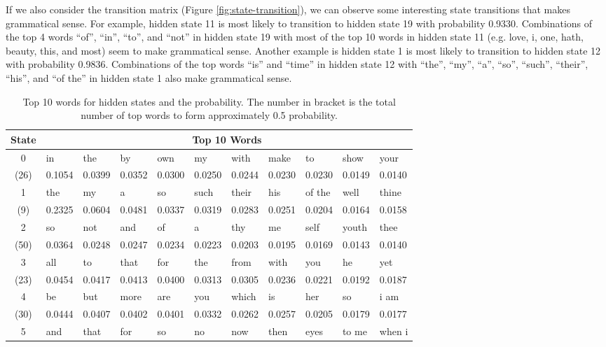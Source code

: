If we also consider the transition matrix (Figure \ref{fig:state-transition}), we can observe some interesting state transitions that makes grammatical sense. For example, hidden state 11 is most likely to transition to hidden state 19 with probability 0.9330. Combinations of the top 4 words ``of'', ``in'', ``to'', and ``not'' in hidden state 19 with most of the top 10 words in hidden state 11 (e.g. love, i, one, hath, beauty, this, and most) seem to make grammatical sense. Another example is hidden state 1 is most likely to transition to hidden state 12 with probability 0.9836. Combinations of the top words ``is'' and ``time'' in hidden state 12 with ``the'', ``my'', ``a'', ``so'', ``such'', ``their'', ``his'', and ``of the'' in hidden state 1 also make grammatical sense.


\begin{table}[h!]
	\centering
	\caption{Top 10 words for hidden states and the probability. The number in bracket is the total number of top words to form approximately 0.5 probability.}\label{tab:top-10-words}
	\begin{tabular}{c||l|l|l|l|l|l|l|l|l|l}
		\hline
		State & \multicolumn{10}{c}{Top 10 Words}\\ \hline
		0 & in & the & by & own & my & with & make & to & show & your \\
		(26) & 0.1054 & 0.0399 & 0.0352 & 0.0300 & 0.0250 & 0.0244 & 0.0230 & 0.0230 & 0.0149 & 0.0140 \\ \hline
		1 & the & my & a & so & such & their & his & of the & well & thine \\
		(9) & 0.2325 & 0.0604 & 0.0481 & 0.0337 & 0.0319 & 0.0283 & 0.0251 & 0.0204 & 0.0164 & 0.0158 \\ \hline
		2 & so & not & and & of & a & thy & me & self & youth & thee \\
		(50) & 0.0364 & 0.0248 & 0.0247 & 0.0234 & 0.0223 & 0.0203 & 0.0195 & 0.0169 & 0.0143 & 0.0140 \\ \hline
		3 & all & to & that & for & the & from & with & you & he & yet \\
		(23) & 0.0454 & 0.0417 & 0.0413 & 0.0400 & 0.0313 & 0.0305 & 0.0236 & 0.0221 & 0.0192 & 0.0187 \\ \hline
		4 & be & but & more & are & you & which & is & her & so & i am \\
		(30) & 0.0444 & 0.0407 & 0.0402 & 0.0401 & 0.0332 & 0.0262 & 0.0257 & 0.0205 & 0.0179 & 0.0177 \\ \hline
		5 & and & that & for & so & no & now & then & eyes & to me & when i \\

\end{tabular}
\end{table}
